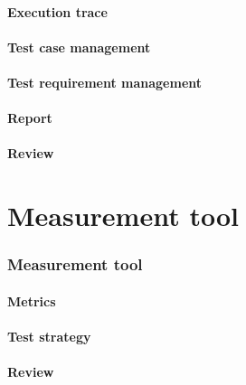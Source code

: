 \documentclass[utf8, english, usepdftitle=false, svgnames, color="table, fixpdftex,  fixinclude, xcdraw", t]{beamer}
\begin{document}
\subsection{Execution trace}


\subsection{Test case management}


\subsection{Test requirement management}


\subsection{Report}


\subsection{Review}



%
\part{Measurement tool}
\section{Measurement tool}


\subsection{Metrics}


\subsection{Test strategy}


\subsection{Review}

\end{document}
